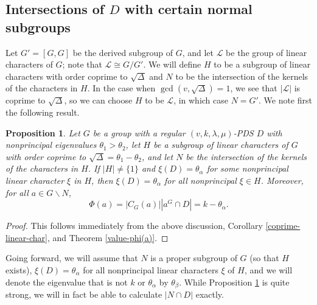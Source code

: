 \documentclass[12pt]{amsproc} %
\newtheorem{prop}[thm]{Proposition}
\theoremstyle{definition}\newtheorem{defn}[thm]{Definition}
\theoremstyle{definition}\newtheorem{rem}[thm]{Remark}
\theoremstyle{definition}\newtheorem{ex}[thm]{Example}
\newcommand{\calL}{\mathcal{L}}
\begin{document}
\subsection{Intersections of $D$ with certain normal subgroups}
\label{subsec:normal}

Let $G' = [G,G]$ be the derived subgroup of $G$, and let $\calL$ be the group of linear characters of $G$; note that $\calL \cong G/G'$. We will define $H$ to be a subgroup of linear characters with order coprime to $\sqrt{\Delta}$ and $N$ to be the intersection of the kernels of the characters in $H$. In the case when $\gcd(v, \sqrt{\Delta}) = 1$, we see that $|\calL|$ is coprime to $\sqrt{\Delta}$, so we can choose $H$ to be $\calL$, in which case $N = G'$. We note first the following result.

\begin{prop}\label{prop:HsameonD}
        Let $G$ be a group with a regular $(v, k, \lambda, \mu)$-PDS $D$ with nonprincipal eigenvalues $\theta_1 > \theta_2$, let $H$ be a subgroup of linear characters of $G$ with order coprime to $\sqrt{\Delta} = \theta_1 - \theta_2$, and let $N$ be the intersection of the kernels of the characters in $H$.  If $|H| \neq \{1\}$ and $\xi(D) = \theta_\alpha$ for some nonprincipal linear character $\xi$ in $H$, then $\xi(D) = \theta_\alpha$ for all nonprincipal $\xi \in H$. Moreover, for all $a \in G \backslash N$,
		 \[ \Phi(a) = |C_G(a)| |a^G \cap D| = k - \theta_\alpha.\]
\end{prop}
        \begin{proof}
                This follows immediately from the above discussion, Corollary \ref{coprime-linear-char}, and Theorem \ref{value-phi(a)}.
        \end{proof}

Going forward, we will assume that $N$ is a proper subgroup of $G$ (so that $H$ exists), $\xi(D) = \theta_\alpha$ for all nonprincipal linear characters $\xi$ of $H$, and we will denote the eigenvalue that is not $k$ or $\theta_\alpha$ by $\theta_\beta$. While Proposition \ref{prop:HsameonD} is quite strong, we will in fact be able to calculate $|N \cap D|$ exactly.
\end{document}
